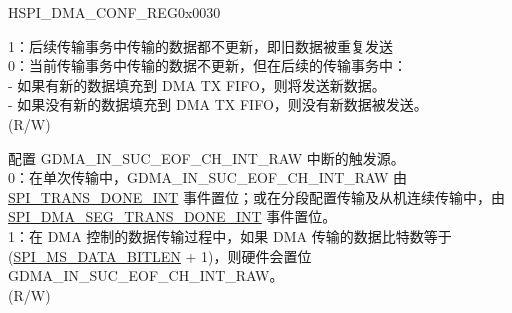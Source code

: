 \begin{register}{H}{SPI\_DMA\_CONF\_REG}{0x0030}
\begin{regdesc}
\begin{reglist}
1：后续传输事务中传输的数据都不更新，即旧数据被重复发送\\
0：当前传输事务中传输的数据不更新，但在后续的传输事务中：\\
        - 如果有新的数据填充到 DMA TX FIFO，则将发送新数据。\\
        - 如果没有新的数据填充到 DMA TX FIFO，则没有新数据被发送。\\
(R/W)
\label{fielddesc:SPIRXEOFEN}\item [SPI\_RX\_EOF\_EN] 配置 GDMA\_IN\_SUC\_EOF\_CH\_INT\_RAW 中断的触发源。\\
0：在单次传输中，GDMA\_IN\_SUC\_EOF\_CH\_INT\_RAW 由 \hyperref[int:SPITRANSDONEINT]{SPI\_TRANS\_DONE\_INT} 事件置位；或在分段配置传输及从机连续传输中，由 \hyperref[int:SPIDMASEGTRANSDONEINT]{SPI\_DMA\_SEG\_TRANS\_DONE\_INT} 事件置位。\\
 1：在 DMA 控制的数据传输过程中，如果 DMA 传输的数据比特数等于 (\hyperref[fielddesc:SPIMSDATABITLEN]{SPI\_MS\_DATA\_BITLEN} + 1)，则硬件会置位 GDMA\_IN\_SUC\_EOF\_CH\_INT\_RAW。\\
(R/W)
\item [见下页]
\end{reglist}\end{regdesc}
\end{register}

